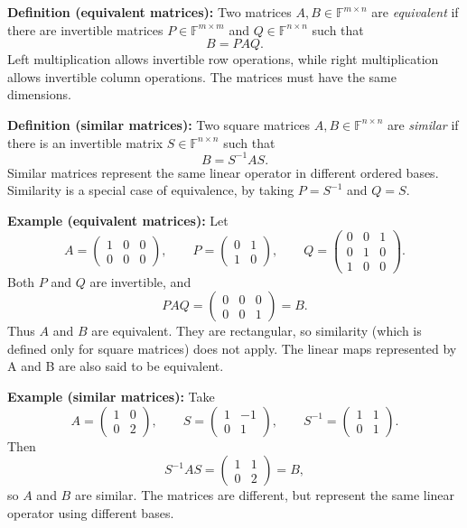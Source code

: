 \documentclass[a4paper,11pt,abstract=true]{scrartcl}
\theoremstyle{dotlessP}
\theoremstyle{dotlessS}
\theoremstyle{remark}
\theoremstyle{definition}
\begin{document}
\begin{definition_box}
\textbf{Definition (equivalent matrices):} Two matrices
$A,B\in\mathbb{F}^{m\times n}$ are \emph{equivalent} if there are
invertible matrices $P\in\mathbb{F}^{m\times m}$ and
$Q\in\mathbb{F}^{n\times n}$ such that
\[
B=PAQ.
\]
Left multiplication allows invertible row operations, while right
multiplication allows invertible column operations. The matrices must
have the same dimensions.
\end{definition_box}

\begin{definition_box}
\textbf{Definition (similar matrices):} Two square matrices
$A,B\in\mathbb{F}^{n\times n}$ are \emph{similar} if there is an
invertible matrix $S\in\mathbb{F}^{n\times n}$ such that
\[
B=S^{-1}AS.
\]
Similar matrices represent the same linear operator in different
ordered bases. Similarity is a special case of equivalence, by taking
$P=S^{-1}$ and $Q=S$.
\end{definition_box}

\begin{example_box}
\textbf{Example (equivalent matrices):} Let
\[
A=\begin{pmatrix}1&0&0\\0&0&0\end{pmatrix},\qquad
P=\begin{pmatrix}0&1\\1&0\end{pmatrix},\qquad
Q=\begin{pmatrix}0&0&1\\0&1&0\\1&0&0\end{pmatrix}.
\]
Both $P$ and $Q$ are invertible, and
\[
PAQ=\begin{pmatrix}0&0&0\\0&0&1\end{pmatrix}=B.
\]
Thus $A$ and $B$ are equivalent. They are rectangular, so similarity
(which is defined only for square matrices) does not apply. The linear maps represented by A and B are also said to be equivalent.
\end{example_box}

\begin{example_box}
\textbf{Example (similar matrices):} Take
\[
A=\begin{pmatrix}1&0\\0&2\end{pmatrix},\qquad
S=\begin{pmatrix}1&-1\\0&1\end{pmatrix},\qquad
S^{-1}=\begin{pmatrix}1&1\\0&1\end{pmatrix}.
\]
Then
\[
S^{-1}AS
=\begin{pmatrix}1&1\\0&2\end{pmatrix}=B,
\]
so $A$ and $B$ are similar. The matrices are different, but represent
the same linear operator using different bases.
\end{example_box}
\end{document}
